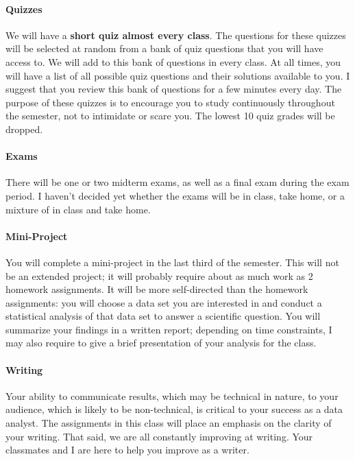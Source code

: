 \documentclass[11pt]{article}
\begin{document}
	\paragraph{Quizzes}
	We will have a \textbf{short quiz almost every class}.  The questions for these quizzes will be selected at random from a bank of quiz questions that you will have access to.  We will add to this bank of questions in every class.  At all times, you will have a list of all possible quiz questions and their solutions available to you.  I suggest that you review this bank of questions for a few minutes every day.  The purpose of these quizzes is to encourage you to study continuously throughout the semester, not to intimidate or scare you.  The lowest 10 quiz grades will be dropped.
	
	\paragraph{Exams}
	There will be one or two midterm exams, as well as a final exam during the exam period.  I haven't decided yet whether the exams will be in class, take home, or a mixture of in class and take home.
	
	\paragraph{Mini-Project}
	You will complete a mini-project in the last third of the semester.  This will not be an extended project; it will probably require about as much work as 2 homework assignments.  It will be more self-directed than the homework assignments: you will choose a data set you are interested in and conduct a statistical analysis of that data set to answer a scientific question.  You will summarize your findings in a written report; depending on time constraints, I may also require to give a brief presentation of your analysis for the class.
	
	\paragraph{Writing}
	Your ability to communicate results, which may be technical in nature, to your audience, which is likely to be non-technical, is critical to your success as a data analyst. The assignments in this class will place an emphasis on the clarity of your writing.  That said, we are all constantly improving at writing.  Your classmates and I are here to help you improve as a writer.
	
\end{document}
